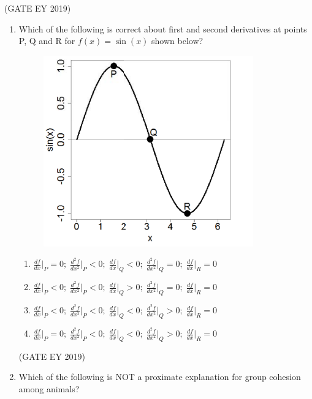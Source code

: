 \documentclass[journal,12pt,onecolumn]{IEEEtran}
\theoremstyle{remark}
\begin{document}
\begin{enumerate}[resume]
\hfill{(GATE EY 2019)}


\end{enumerate}
\begin{enumerate}[resume]

\item Which of the following is correct about first and second derivatives at points P, Q and R for $f(x) = \sin(x)$ shown below?  
\begin{figure}[H]
    \centering
    \includegraphics[]{figs/30.png}
    \caption{}
    \label{fig:5}
\end{figure}


\begin{enumerate}
\item  $\frac{df}{dx}\Big|_P = 0;\; \frac{d^2f}{dx^2}\Big|_P < 0;\; \frac{df}{dx}\Big|_Q < 0;\; \frac{d^2f}{dx^2}\Big|_Q = 0;\; \frac{df}{dx}\Big|_R = 0$
\item    $\frac{df}{dx}\Big|_P < 0;\; \frac{d^2f}{dx^2}\Big|_P < 0;\; \frac{df}{dx}\Big|_Q > 0;\; \frac{d^2f}{dx^2}\Big|_Q = 0;\; \frac{df}{dx}\Big|_R = 0$ 
\item  $\frac{df}{dx}\Big|_P < 0;\; \frac{d^2f}{dx^2}\Big|_P < 0;\; \frac{df}{dx}\Big|_Q < 0;\; \frac{d^2f}{dx^2}\Big|_Q > 0;\; \frac{df}{dx}\Big|_R = 0$
\item$\frac{df}{dx}\Big|_P = 0;\; \frac{d^2f}{dx^2}\Big|_P < 0;\; \frac{df}{dx}\Big|_Q < 0;\; \frac{d^2f}{dx^2}\Big|_Q > 0;\; \frac{df}{dx}\Big|_R = 0$
\end{enumerate}



\hfill{(GATE EY 2019)}
\item Which of the following is NOT a proximate explanation for group cohesion among animals?  


\end{enumerate}
\end{document}
